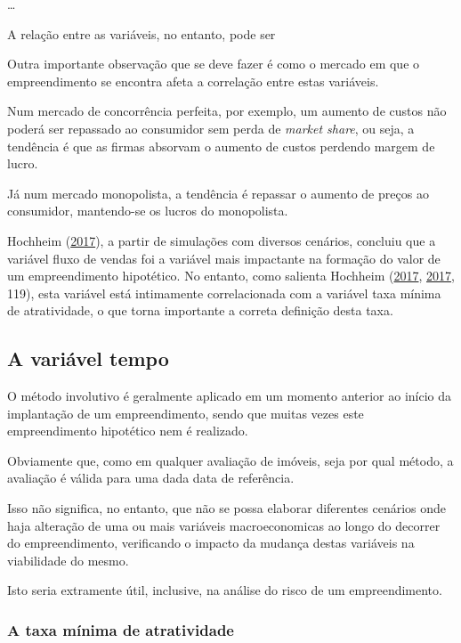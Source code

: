 \documentclass[
	12pt,				%
	oneside,			%
	a4paper,			%
	chapter=TITLE,		%
	section=TITLE,		%
	english,			%
	brazil				%
	]{abntex2}
\begin{document}
\ldots{}

A relação entre as variáveis, no entanto, pode ser

Outra importante observação que se deve fazer é como o mercado em que o
empreendimento se encontra afeta a correlação entre estas variáveis.

Num mercado de concorrência perfeita, por exemplo, um aumento de custos não
poderá ser repassado ao consumidor sem perda de \emph{market share}, ou seja, a
tendência é que as firmas absorvam o aumento de custos perdendo margem de lucro.

Já num mercado monopolista, a tendência é repassar o aumento de preços ao
consumidor, mantendo-se os lucros do monopolista.

Hochheim (\protect\hyperlink{ref-gahochheim}{2017}), a partir de simulações com diversos cenários, concluiu que a
variável fluxo de vendas foi a variável mais impactante na formação do valor
de um empreendimento hipotético. No entanto, como salienta Hochheim (\protect\hyperlink{ref-gahochheim}{2017}, \protect\hyperlink{ref-gahochheim}{2017}, 119), esta variável está intimamente correlacionada com a
variável taxa mínima de atratividade, o que torna importante a correta definição
desta taxa.

\hypertarget{a-variuxe1vel-tempo}{%
\subsection{A variável tempo}\label{a-variuxe1vel-tempo}}

O método involutivo é geralmente aplicado em um momento anterior ao início da
implantação de um empreendimento, sendo que muitas vezes este empreendimento
hipotético nem é realizado.

Obviamente que, como em qualquer avaliação de imóveis, seja por qual método, a
avaliação é válida para uma dada data de referência.

Isso não significa, no entanto, que não se possa elaborar diferentes cenários
onde haja alteração de uma ou mais variáveis macroeconomicas ao longo do
decorrer do empreendimento, verificando o impacto da mudança destas variáveis
na viabilidade do mesmo.

Isto seria extramente útil, inclusive, na análise do risco de um empreendimento.

\hypertarget{a-taxa-muxednima-de-atratividade}{%
\subsubsection{A taxa mínima de atratividade}\label{a-taxa-muxednima-de-atratividade}}
\end{document}
